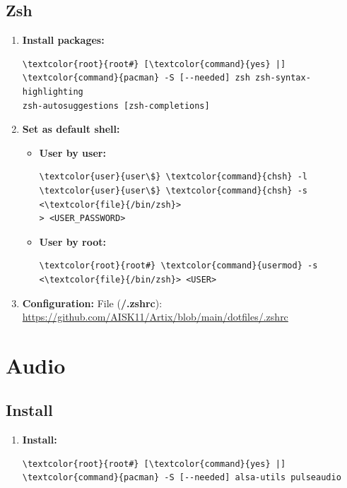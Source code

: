 \documentclass[10pt, a4paper, onecolumn, oneside, titlepage, openany]{book}
\begin{document}
\section{Zsh}
\begin{enumerate}
    \item \textbf{Install packages:}
\begin{Verbatim}[commandchars=\\\{\}]
\textcolor{root}{root#} [\textcolor{command}{yes} |] \textcolor{command}{pacman} -S [--needed] zsh zsh-syntax-highlighting 
zsh-autosuggestions [zsh-completions]
\end{Verbatim}
    \item \textbf{Set as default shell:}
    \begin{itemize}
        \item \textbf{User by user:}
\begin{Verbatim}[commandchars=\\\{\}]
\textcolor{user}{user\$} \textcolor{command}{chsh} -l
\textcolor{user}{user\$} \textcolor{command}{chsh} -s <\textcolor{file}{/bin/zsh}>
> <USER_PASSWORD>
\end{Verbatim}        
        \item \textbf{User by root:}
\begin{Verbatim}[commandchars=\\\{\}]
\textcolor{root}{root#} \textcolor{command}{usermod} -s <\textcolor{file}{/bin/zsh}> <USER>
\end{Verbatim}
    \end{itemize}
    \item \textbf{Configuration:}
\newline File (\textbf{\textcolor{file}{\texttildelow/.zshrc}}):
\newline \url{https://github.com/AISK11/Artix/blob/main/dotfiles/.zshrc}
\end{enumerate}


\chapter{Audio}
\section{Install}
\begin{enumerate}
    \item \textbf{Install:}
\begin{Verbatim}[commandchars=\\\{\}]
\textcolor{root}{root#} [\textcolor{command}{yes} |] \textcolor{command}{pacman} -S [--needed] alsa-utils pulseaudio
\end{Verbatim}
\end{enumerate}
\end{document}
